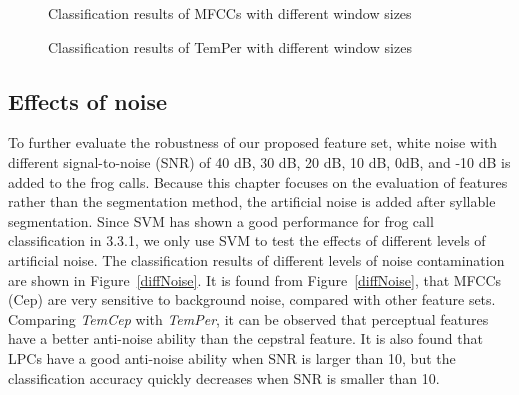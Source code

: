 \begin{figure}[htb!] %
\caption{Classification results of MFCCs with different window sizes}
\label{diffWinSize1} 
\end{figure}

\begin{figure}[htb!] %
\caption{Classification results of TemPer with different window sizes}
\label{diffWinSize2} 
\end{figure}

\subsection{Effects of noise}
To further evaluate the robustness of our proposed feature set, white noise with different signal-to-noise (SNR) of 40 dB, 30 dB, 20 dB, 10 dB, 0dB, and -10 dB is added to the frog calls. Because this chapter focuses on the evaluation of features rather than the segmentation method, the artificial noise is added after syllable segmentation. Since SVM has shown a good performance for frog call classification in 3.3.1, we only use SVM to test the effects of different levels of artificial noise. The classification results of different levels of noise contamination are shown in Figure~\ref{diffNoise}. It is found from Figure~\ref{diffNoise}, that MFCCs (Cep) are very sensitive to background noise, compared with other feature sets. Comparing \textit{TemCep} with \textit{TemPer}, it can be observed that perceptual features have a better anti-noise ability than the cepstral feature. It is also found that LPCs have a good anti-noise ability when SNR is larger than 10, but the classification accuracy quickly decreases when SNR is smaller than 10. 


